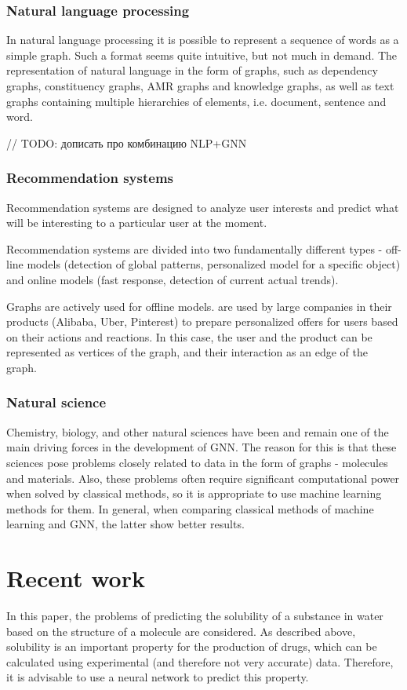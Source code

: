 \documentclass[a4paper,14pt]{article}
\begin{document}
\subsubsection*{Natural language processing}
In natural language processing it is possible to represent a sequence of words as a simple graph. Such a format seems quite intuitive, but not much in demand. The representation of natural language in the form of graphs, such as dependency graphs, constituency graphs, AMR graphs and knowledge graphs, as well as text graphs containing multiple hierarchies of elements, i.e. document, sentence and word.

// TODO: дописать про комбинацию NLP+GNN

\subsubsection*{Recommendation systems}
Recommendation systems are designed to analyze user interests and predict what will be interesting to a particular user at the moment.

Recommendation systems are divided into two fundamentally different types - off-line models (detection of global patterns, personalized model for a specific object) and online models (fast response, detection of current actual trends). 

Graphs are actively used for offline models. are used by large companies in their products (Alibaba, Uber, Pinterest) to prepare personalized offers for users based on their actions and reactions. In this case, the user and the product can be represented as vertices of the graph, and their interaction as an edge of the graph.

\subsubsection*{Natural science}

Chemistry, biology, and other natural sciences have been and remain one of the main driving forces in the development of GNN. The reason for this is that these sciences pose problems closely related to data in the form of graphs - molecules and materials. Also, these problems often require significant computational power when solved by classical methods, so it is appropriate to use machine learning methods for them. In general, when comparing classical methods of machine learning and GNN, the latter show better results.

\section{Recent work}
In this paper, the problems of predicting the solubility of a substance in water based on the structure of a molecule are considered. As described above, solubility is an important property for the production of drugs, which can be calculated using experimental (and therefore not very accurate) data. Therefore, it is advisable to use a neural network to predict this property.
\end{document}
